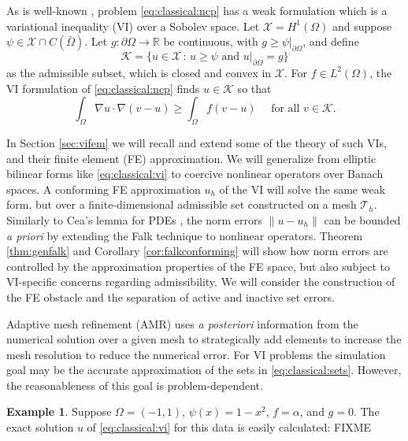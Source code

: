 \documentclass[]{interact}
\theoremstyle{plain}%
\theoremstyle{definition}
\newtheorem{example}[theorem]{Example}
\theoremstyle{remark}
\newcommand{\RR}{\mathbb{R}}
\newcommand{\cK}{\mathcal{K}}
\newcommand{\cT}{\mathcal{T}}
\newcommand{\cX}{\mathcal{X}}
\begin{document}
As is well-known \cite{KinderlehrerStampacchia1980}, problem \eqref{eq:classical:ncp} has a weak formulation which is a variational inequality (VI) over a Sobolev space.  Let $\cX=H^1(\Omega)$ \cite{ElmanSilvesterWathen2014} and suppose $\psi \in \cX \cap C(\bar\Omega)$.  Let $g:\partial \Omega\to \RR$ be continuous, with $g\ge\psi|_{\partial \Omega}$, and define
\begin{equation} \label{eq:classical:admissible}
\cK = \{u \in \cX \,:\, u \ge \psi \text{ and } u|_{\partial \Omega} = g\}
\end{equation}
as the admissible subset, which is closed and convex in $\cX$.  For $f\in L^2(\Omega)$, the VI formulation of \eqref{eq:classical:ncp} finds $u\in \cK$ so that
\begin{equation} \label{eq:classical:vi}
\int_\Omega \nabla u \cdot \nabla(v - u) \ge \int_\Omega f(v - u) \quad \text{ for all } v \in \cK.
\end{equation}

In Section \ref{sec:vifem} we will recall and extend some of the theory of such VIs, and their finite element (FE) approximation.  We will generalize from elliptic bilinear forms like \eqref{eq:classical:vi} to coercive nonlinear operators over Banach spaces.  A conforming FE approximation $u_h$ of the VI will solve the same weak form, but over a finite-dimensional admissible set constructed on a mesh $\cT_h$.  Similarly to Cea's lemma for PDEs \cite{ElmanSilvesterWathen2014}, the norm errors $\|u-u_h\|$ can be bounded \emph{a priori} by extending the Falk \cite{Falk1974} technique to nonlinear operators.  Theorem \ref{thm:genfalk} and Corollary \ref{cor:falkconforming} will show how norm errors are controlled by the approximation properties of the FE space, but also subject to VI-specific concerns regarding admissibility.  We will consider the construction of the FE obstacle and the separation of active and inactive set errors.

Adaptive mesh refinement (AMR) uses \emph{a posteriori} information from the numerical solution over a given mesh to strategically add elements to increase the mesh resolution to reduce the numerical error.  For VI problems the simulation goal may be the accurate approximation of the sets in \eqref{eq:classical:sets}.  However, the reasonableness of this goal is problem-dependent.

\begin{example} \label{example:notcontinuous}  Suppose $\Omega = (-1,1)$, $\psi(x)=1 - x^2$, $f=\alpha$, and $g=0$.  The exact solution $u$ of \eqref{eq:classical:vi} for this data is easily calculated: FIXME
\end{example}
\end{document}
